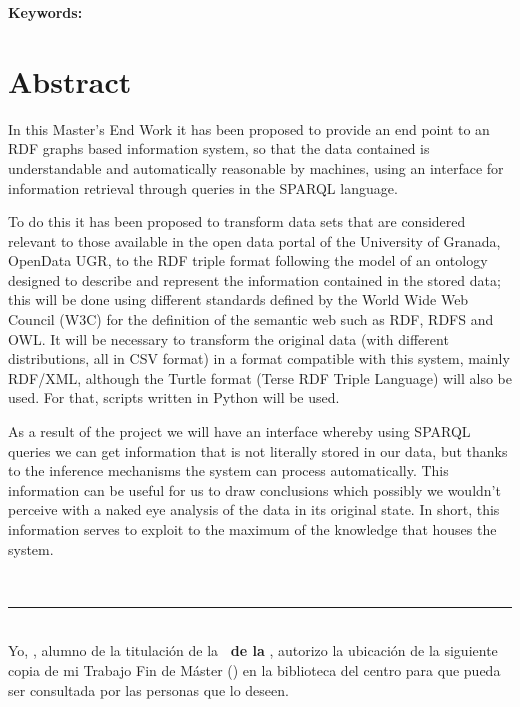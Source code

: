 \textbf{Keywords: }{\keywordsEn}

\section*{Abstract}

In this {\sf Master’s End Work} it has been proposed to provide an end point to an {\sf RDF graphs} based information system, so that the data contained is understandable and automatically reasonable by machines, using an interface for information retrieval through queries in the {\sf SPARQL} language.
\bigskip

To do this it has been proposed to transform data sets that are considered relevant to those available in the open data portal of the {\sf University of Granada}, {\sf OpenData UGR}, to the RDF triple format following the model of an ontology designed to describe and represent the information contained in the stored data; this will be done using different standards defined by the {\sf World Wide Web Council (W3C)} for the definition of the semantic web such as {\sf RDF}, {\sf RDFS} and {\sf OWL}. It will be necessary to transform the original data (with different distributions, all in {\sf CSV} format) in a format compatible with this system, mainly {\sf RDF/XML}, although the {\sf Turtle} format ({\sf Terse RDF Triple Language}) will also be used. For that, scripts written in {\sf Python} will be used.

\bigskip
As a result of the project we will have an interface whereby using {\sf SPARQL} queries we can get information that is not literally stored in our data, but thanks to the inference mechanisms the system can process automatically. This information can be useful for us to draw conclusions which possibly we wouldn't perceive with a naked eye analysis of  the data in its original state. In short, this information serves to exploit to the maximum of the knowledge that houses the system.

\newpage
\thispagestyle{empty}
\
\vspace{3cm}

\noindent\rule[-1ex]{\textwidth}{2pt}\\[4.5ex]

Yo, \textbf{\autor}, alumno de la titulación \textbf{\master} de la \textbf{\escuela\ de la \universidad}, autorizo la ubicación de la siguiente copia de mi Trabajo Fin de Máster (\textit{\titulo}) en la biblioteca del centro para que pueda ser consultada por las personas que lo deseen.

